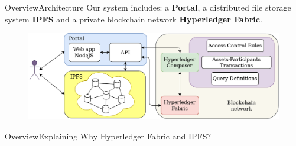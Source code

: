 \begin{frame}{Overview}{Architecture}
    Our system includes: \pause a \textbf{Portal}, \pause a distributed file storage system \textbf{IPFS} \pause and a private blockchain network \textbf{Hyperledger Fabric}.
    \pause
    \begin{figure}
        \centering
        \includegraphics[width=.9\textwidth,height=0.4\textwidth]{img/ArOv.png}
    \end{figure}
\end{frame}

\begin{frame}{Overview}{Explaining}
    Why Hyperledger Fabric and IPFS?
    \begin{itemize}
    \end{itemize}
\end{frame}



